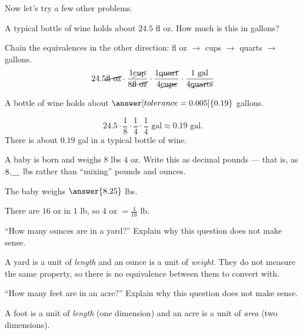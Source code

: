 \documentclass[12pt]{ximera}
\begin{document}
Now let's try a few other problems.

\begin{problem}
A typical bottle of wine holds about $24.5$ fl oz. How much is this in gallons?

\begin{hint}
Chain the equivalences in the other direction: fl oz $\to$ cups $\to$ quarts $\to$ gallons.
\[
24.5 \cancel{\text{fl oz}} \cdot \frac{1 \cancel{\text{cup}}}{8 \cancel{\text{fl oz}}}
\cdot \frac{1 \cancel{\text{quart}}}{4 \cancel{\text{cups}}}
\cdot \frac{1 \text{ gal}}{4 \cancel{\text{quarts}}}
\]
\end{hint}

A bottle of wine holds about $\answer[tolerance=0.005]{0.19}$ gallons.

\begin{solution}
\[
24.5 \cdot \frac{1}{8} \cdot \frac{1}{4} \cdot \frac{1}{4} \text{ gal}
\approx 0.19 \text{ gal}.
\]
There is about $0.19$ gal in a typical bottle of wine.
\end{solution}
\end{problem}

\begin{problem}
A baby is born and weighs $8$ lbs $4$ oz. Write this as decimal pounds --- that is,
as $8.\underline{\hphantom{00}}$ lbs rather than ``mixing'' pounds and ounces.

The baby weighs $\answer{8.25}$ lbs.

\begin{hint}
There are $16$ oz in $1$ lb, so $4$ oz $= \frac{4}{16}$ lb.
\end{hint}
\end{problem}

\begin{problem}
``How many ounces are in a yard?'' Explain why this question does not make sense.

\begin{freeResponse}
\end{freeResponse}

\begin{solution}
A yard is a unit of \emph{length} and an ounce is a unit of \emph{weight}. They do
not measure the same property, so there is no equivalence between them to convert with.
\end{solution}
\end{problem}

\begin{problem}
``How many feet are in an acre?'' Explain why this question does not make sense.

\begin{freeResponse}
\end{freeResponse}

\begin{solution}
A foot is a unit of \emph{length} (one dimension) and an acre is a unit of
\emph{area} (two dimensions).
\end{solution}
\end{problem}
\end{document}
